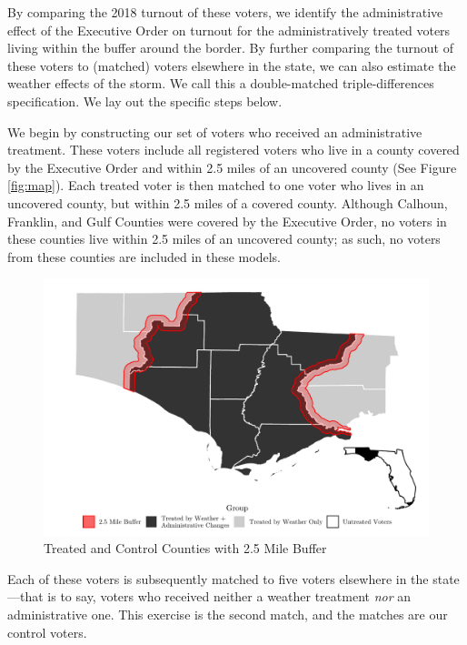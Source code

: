 \documentclass[
  12pt,
]{article}
\begin{document}
By comparing the 2018 turnout of these voters, we identify the administrative effect of the Executive Order on turnout for the administratively treated voters living within the buffer around the border. By further comparing the turnout of these voters to (matched) voters elsewhere in the state, we can also estimate the weather effects of the storm. We call this a double-matched triple-differences specification. We lay out the specific steps below.

We begin by constructing our set of voters who received an administrative treatment. These voters include all registered voters who live in a county covered by the Executive Order and within 2.5 miles of an uncovered county (See Figure \ref{fig:map}). Each treated voter is then matched to one voter who lives in an uncovered county, but within 2.5 miles of a covered county. Although Calhoun, Franklin, and Gulf Counties were covered by the Executive Order, no voters in these counties live within 2.5 miles of an uncovered county; as such, no voters from these counties are included in these models.

\begin{figure}[h]

{\centering \includegraphics{hurricane_michael_files/figure-latex/map-chunk-1} 

}

\caption{\label{fig:map}Treated and Control Counties with 2.5 Mile Buffer}\label{fig:map-chunk}
\end{figure}

Each of these voters is subsequently matched to five voters elsewhere in the state---that is to say, voters who received neither a weather treatment \emph{nor} an administrative one. This exercise is the second match, and the matches are our control voters.
\end{document}
